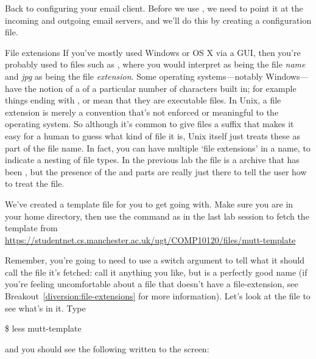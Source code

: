 Back to configuring your email client. Before we use , we need to point it at the incoming and outgoing email servers, and we'll do this by creating a configuration file.

\begin{diversion}{File extensions}
\label{diversion:file-extensions}
If you've mostly used Windows or OS X via a GUI, then you're probably used to files such as , where you would interpret  as being the file \textit{name} and \textit{jpg} as being the file \textit{extension}. Some operating systems---notably Windows---have the notion of a  of a particular number of characters built in; for example things ending with ,  or  mean that they are executable files. In Unix, a file extension is merely a convention that's not enforced or meaningful to the operating system. So although it's common to give files a suffix that makes it easy for a human to guess what kind of file it is, Unix itself just treats these as part of the file name. In fact, you can have multiple `file extensions' in a name, to indicate a nesting of file types. In the previous lab the file  is a  archive that has been , but the presence of the  and  parts are really just there to tell the user how to treat the file.
\end{diversion}

We've created a template file for you to get going with. Make sure you are in your home directory, then use the  command as in the last lab session to fetch the template from  \\
\url{https://studentnet.cs.manchester.ac.uk/ugt/COMP10120/files/mutt-template}


Remember, you're going to need to use a switch argument to tell  what it should call the file it's fetched: call it anything you like, but  is a perfectly good name (if you're feeling uncomfortable about a file that doesn't have a file-extension, see Breakout~\ref{diversion:file-extensions} for more information). Let's look at the file to see what's in it. Type

\begin{ttoutenv}
\$ less mutt-template
\end{ttoutenv}

\enlargethispage{\baselineskip}
and you should see the following written to the screen:
\begin{ttoutenv}

\end{ttoutenv}

